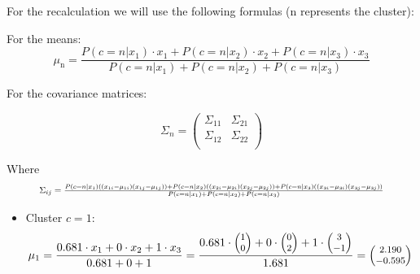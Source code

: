 \documentclass[12pt]{article}
\begin{document}
\begin{enumerate}
\begin{enumerate}[label=\arabic*)]
        \vspace{10pt}
        For the recalculation we will use the following formulas (n represents the cluster):

        \vspace{10pt}
        For the means:
        \begin{equation}\label{means}
            \mu_\text{n} = \frac{P(c=n|x_1) \cdot x_1 + P(c=n|x_2) \cdot x_2 + P(c=n|x_3) \cdot x_3}{P(c=n|x_1) + P(c=n|x_2) + P(c=n|x_3)}
        \end{equation}

        \vspace{10pt}
        For the covariance matrices:

        \begin{equation}\label{covariance_matrix}
            \Sigma_n = \begin{pmatrix}
                \Sigma_{11} & \Sigma_{21} \\
                \Sigma_{12} & \Sigma_{22} \\
            \end{pmatrix}
        \end{equation}
        
        Where
        \begin{equation*}
            \resizebox{0.88\hsize}{!}{$
            \Sigma_{ij} = \frac{
              P(c=n|x_1)\left(\left(x_{1i} - \mu_{1i}\right) \left(x_{1j}- \mu_{1j}\right)\right) 
            + P(c=n|x_2)\left(\left(x_{2i} - \mu_{2i}\right) \left(x_{2j}- \mu_{2j}\right)\right) 
            + P(c=n|x_3)\left(\left(x_{3i} - \mu_{3i}\right) \left(x_{3j}- \mu_{3j}\right)\right)
            }{P(c=n|x_1) + P(c=n|x_2) + P(c=n|x_3)}
            $}
        \end{equation*}
        
        \newpage
        \begin{itemize}[label=]
            \item Cluster $c=1$:
        \begin{equation*}
            \footnotesize
            \mu_1 = \frac{0.681 \cdot x_1 + 0 \cdot x_2 + 1 \cdot x_3}{0.681+0+1} = \frac{0.681 \cdot \begin{pmatrix}
            1\\
            0
            \end{pmatrix}+ 0 \cdot \begin{pmatrix}
            0\\
            2
            \end{pmatrix} + 1 \cdot \begin{pmatrix}
            3\\
            -1
            \end{pmatrix}}{1.681} = \begin{pmatrix}
            2.190\\
            -0.595
            \end{pmatrix}\\
        \end{equation*}


\end{itemize}
\end{enumerate}
\end{enumerate}
\end{document}
